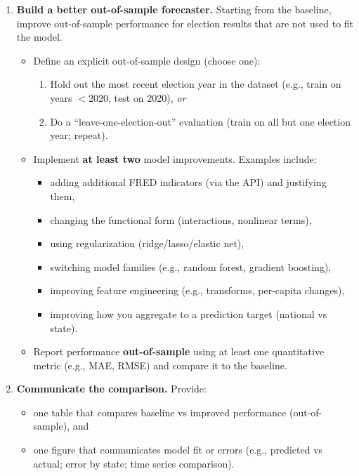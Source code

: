\documentclass[11pt]{article}
\begin{document}
\begin{enumerate}
\item \textbf{Build a better out-of-sample forecaster.}
Starting from the baseline, improve out-of-sample performance for election results that are not used to fit the model.
\begin{itemize}
  \item Define an explicit out-of-sample design (choose one):
    \begin{enumerate}
      \item Hold out the most recent election year in the dataset (e.g., train on years $< 2020$, test on 2020), \emph{or}
      \item Do a ``leave-one-election-out'' evaluation (train on all but one election year; repeat).
    \end{enumerate}
  \item Implement \textbf{at least two} model improvements. Examples include:
    \begin{itemize}
      \item adding additional FRED indicators (via the API) and justifying them,
      \item changing the functional form (interactions, nonlinear terms),
      \item using regularization (ridge/lasso/elastic net),
      \item switching model families (e.g., random forest, gradient boosting),
      \item improving feature engineering (e.g., transforms, per-capita changes),
      \item improving how you aggregate to a prediction target (national vs state).
    \end{itemize}
  \item Report performance \textbf{out-of-sample} using at least one quantitative metric (e.g., MAE, RMSE) and compare it to the baseline.
\end{itemize}

\item \textbf{Communicate the comparison.}
Provide:
\begin{itemize}
  \item one table that compares baseline vs improved performance (out-of-sample), and
  \item one figure that communicates model fit or errors (e.g., predicted vs actual; error by state; time series comparison).
\end{itemize}
\end{enumerate}
\end{document}
